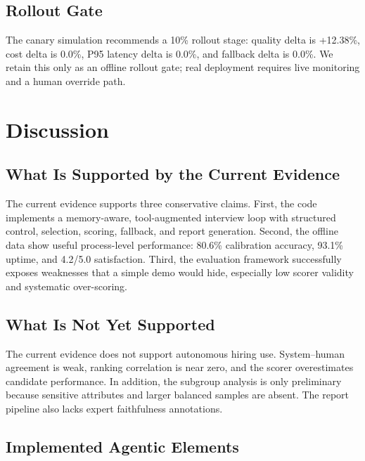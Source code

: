 ﻿\documentclass[final,3p,times,authoryear]{elsarticle}
\begin{document}
\subsection{Rollout Gate}

\noindent The canary simulation recommends a 10\% rollout stage: quality delta is +12.38\%, cost delta is 0.0\%, P95 latency delta is 0.0\%, and fallback delta is 0.0\%. We retain this only as an offline rollout gate; real deployment requires live monitoring and a human override path.

\section{Discussion}
\label{sec:discussion}

\subsection{What Is Supported by the Current Evidence}

\noindent The current evidence supports three conservative claims. First, the code implements a memory-aware, tool-augmented interview loop with structured control, selection, scoring, fallback, and report generation. Second, the offline data show useful process-level performance: 80.6\% calibration accuracy, 93.1\% uptime, and 4.2/5.0 satisfaction. Third, the evaluation framework successfully exposes weaknesses that a simple demo would hide, especially low scorer validity and systematic over-scoring.

\subsection{What Is Not Yet Supported}

\noindent The current evidence does not support autonomous hiring use. System--human agreement is weak, ranking correlation is near zero, and the scorer overestimates candidate performance. In addition, the subgroup analysis is only preliminary because sensitive attributes and larger balanced samples are absent. The report pipeline also lacks expert faithfulness annotations.

\subsection{Implemented Agentic Elements}
\end{document}
